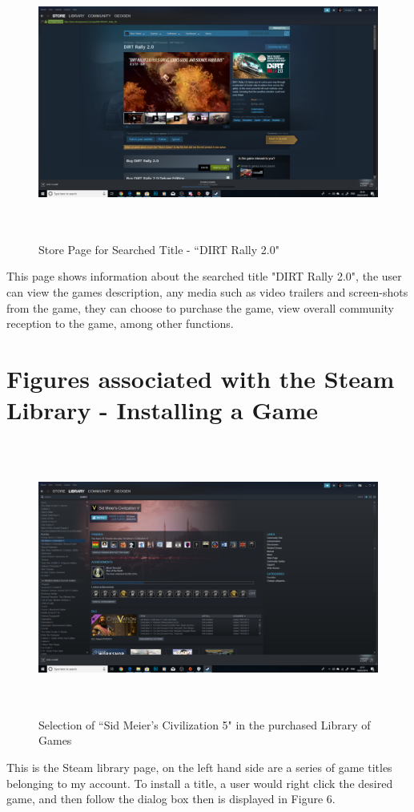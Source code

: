 \begin{figure}[H]
\includegraphics[width=16cm,height=9cm]{Screenshots/SteamScreenShots/PageForSearchedGameDirt.png}
\caption{Store Page for Searched Title - ``DIRT Rally 2.0"}    
\end{figure}
This page shows information about the searched title "DIRT Rally 2.0", the user can view the games description, any media such as video trailers and screen-shots from the game, they can choose to purchase the game, view overall community reception to the game, among other functions.

\section{Figures associated with the Steam Library - Installing a Game}
\begin{figure}[H]
\includegraphics[width=16cm,height=9cm]{Screenshots/SteamScreenShots/SelectAPurchasedGame.png}
\caption{Selection of ``Sid Meier's Civilization 5" in the purchased Library of Games}    
\end{figure}
This is the Steam library page, on the left hand side are a series of game titles belonging to my account. To install a title, a user would right click the desired game, and then follow the dialog box then is displayed in Figure 6.

